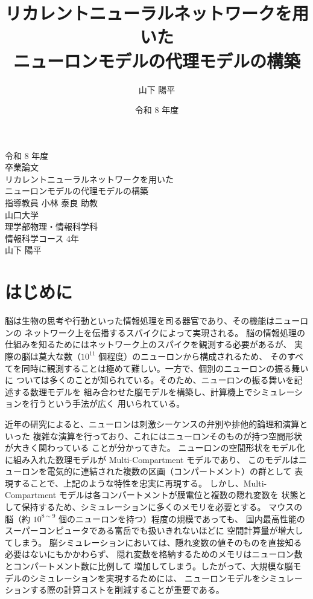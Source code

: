 \documentclass[a4paper,11pt,openany]{ltjsreport}
\title{リカレントニューラルネットワークを用いた\\ニューロンモデルの代理モデルの構築}
\author{山下 陽平}
\date{令和 8 年度}
\newcommand{\TODO}[1]{\textcolor{red}{\textbf{[TODO: #1]}}}
\begin{document}
\begin{titlepage}
  \centering
  \vspace*{20mm}
  {\Large 令和 8 年度}\\[15mm]
  {\LARGE 卒業論文}\\[25mm]
  {\LARGE リカレントニューラルネットワークを用いた}\\[3mm]
  {\LARGE ニューロンモデルの代理モデルの構築}\\[35mm]
  {\large 指導教員 小林 泰良 助教}\\[20mm]
  {\large 山口大学}\\[3mm]
  {\large 理学部\quad 物理・情報科学科}\\[3mm]
  {\large 情報科学コース 4年}\\[20mm]
  {\large 山下 陽平}
  \vfill
\end{titlepage}

\tableofcontents
\clearpage

\chapter{はじめに}

脳は生物の思考や行動といった情報処理を司る器官であり、その機能はニューロンの
ネットワーク上を伝播するスパイクによって実現される\cite{yamazaki2021}。
脳の情報処理の仕組みを知るためにはネットワーク上のスパイクを観測する必要があるが、
実際の脳は莫大な数（$10^{11}$ 個程度\cite{kandel2022}）のニューロンから構成されるため、
そのすべてを同時に観測することは極めて難しい。一方で、個別のニューロンの振る舞いに
ついては多くのことが知られている。そのため、ニューロンの振る舞いを記述する数理モデルを
組み合わせた脳モデルを構築し、計算機上でシミュレーションを行うという手法が広く
用いられている。

近年の研究によると、ニューロンは刺激シーケンスの弁別や排他的論理和演算といった
複雑な演算を行っており、これにはニューロンそのものが持つ空間形状が大きく関わっている
ことが分かってきた\cite{gidon2020,branco2010}。
ニューロンの空間形状をモデル化に組み入れた数理モデルが Multi-Compartment モデルであり、
このモデルはニューロンを電気的に連結された複数の区画（コンパートメント）の群として
表現することで、上記のような特性を忠実に再現する。
しかし、Multi-Compartment モデルは各コンパートメントが膜電位と複数の隠れ変数を
状態として保持するため、シミュレーションに多くのメモリを必要とする\cite{yamazaki2021}。
マウスの脳（約 $10^{8\sim9}$ 個のニューロンを持つ）程度の規模であっても、
国内最高性能のスーパーコンピュータである富岳でも扱いきれないほどに
空間計算量が増大してしまう\cite{kobayashi2024}。
脳シミュレーションにおいては、隠れ変数の値そのものを直接知る必要はないにもかかわらず、
隠れ変数を格納するためのメモリはニューロン数とコンパートメント数に比例して
増加してしまう。したがって、大規模な脳モデルのシミュレーションを実現するためには、
ニューロンモデルをシミュレーションする際の計算コストを削減することが重要である。
\end{document}
